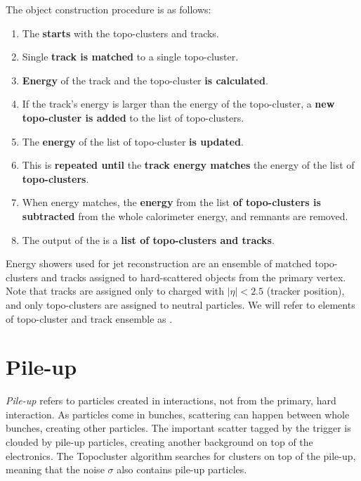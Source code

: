 The object construction procedure is as follows:
\begin{enumerate}
    \item The \PFa \textbf{starts} with the topo-clusters and tracks.
    \item Single \textbf{track is matched} to a single topo-cluster.
    \item \textbf{Energy} of the track and the topo-cluster \textbf{is calculated}.
    \item If the track's energy is larger than the energy of the topo-cluster, a \textbf{new topo-cluster is added} to the list of topo-clusters.
    \item The \textbf{energy} of the list of topo-cluster \textbf{is updated}.
    \item This is \textbf{repeated until} the \textbf{track energy matches} the energy of the list of \textbf{topo-clusters}.
    \item When energy matches, the \textbf{energy} from the list \textbf{of topo-clusters is subtracted} from the whole calorimeter energy, and remnants are removed.
    \item The output of the \PFa is a \textbf{list of topo-clusters and tracks}.
\end{enumerate}

Energy showers used for jet reconstruction are an ensemble of matched topo-clusters and tracks assigned to hard-scattered objects from the primary vertex. 
Note that tracks are assigned only to charged with $|\eta| < 2.5$ (tracker position), and only topo-clusters are assigned to neutral particles.
We will refer to elements of topo-cluster and track ensemble as \PFOs. 

\section{Pile-up}
\label{sec:pileup}
\emph{Pile-up} refers to particles created in interactions, not from the primary, hard interaction.
As particles come in bunches, scattering can happen between whole bunches, creating other particles.
The important scatter tagged by the trigger is clouded by pile-up particles, creating another background on top of the electronics.
The Topocluster algorithm searches for clusters on top of the pile-up, meaning that the noise $\sigma$ also contains pile-up particles.

